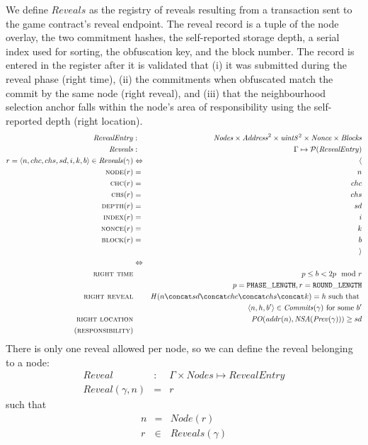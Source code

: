 \begin{definition}
\label{def:reveals}
We define $\mathit{Reveals}$ as the registry of reveals resulting from a transaction sent to the game contract's reveal endpoint. The reveal record is a tuple of the node overlay, the two commitment hashes, the self-reported storage depth, a serial index used for sorting, the obfuscation key, and the block number. The record is entered in the register after it is validated that (i) it was submitted during the reveal phase (right time), (ii) the commitments when obfuscated match the commit by the same node (right reveal), and (iii) that the neighbourhood selection anchor falls within the node's area of responsibility using the self-reported depth (right location). 
%
\begin{eqnarray}
\mathit{RevealEntry}&:&\mathit{Nodes}\times\mathit{Address}^2\times\mathit{uint8}^2\times\mathit{Nonce}\times\mathit{Blocks}\\
\mathit{Reveals}&:&\Gamma\mapsto\mathcal{P}(\mathit{RevealEntry})\\
r=\langle n,chc,chs,sd,i,k,b\rangle\in\mathit{Reveals}(\gamma)&\Leftrightarrow& 
\langle\\
\textsc{node}(r)&=&n\\
\textsc{chc}(r)&=&chc\\
\textsc{chs}(r)&=&chs\\
\textsc{depth}(r)&=&sd\\
\textsc{index}(r)&=&i\\
\textsc{nonce}(r)&=&k\\
\textsc{block}(r)&=&b\\
&&\rangle\\
&\Leftrightarrow&\\
\textsc{right time}
&&p \leq b < 2p \mod r\\
&& p = \mathtt{PHASE\_LENGTH}, r= \mathtt{ROUND\_LENGTH} \\
\textsc{right reveal}&&\mathit{H}(n\concat sd\concat chc\concat chs\concat k)=h \text{ such that }\\
&&\langle n,h,b'\rangle\in\mathit{Commits}(\gamma)\text{ for some }b'\\
\textsc{right location}&&\mathit{PO}(\mathit{addr}(n),\mathit{NSA}(\mathit{Prev}(\gamma)))\geq sd\\
(\textsc{responsibility})&&
\end{eqnarray}
%
There is only one reveal allowed per node, so we can define the reveal belonging to a node:
%
\begin{eqnarray}
\mathit{Reveal}&:&\Gamma\times\mathit{Nodes}\mapsto\mathit{RevealEntry}\\
\mathit{Reveal}(\gamma, n)&=&r
\end{eqnarray}
such that 
\begin{eqnarray}
n&=&\mathit{Node}(r)\\
r&\in&\mathit{Reveals}(\gamma)
\end{eqnarray}
\end{definition}

